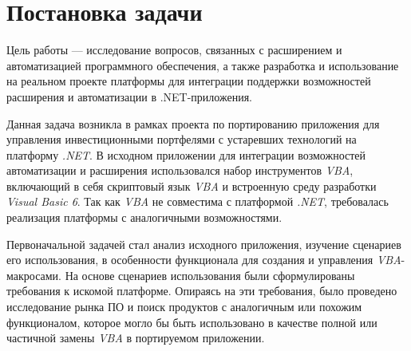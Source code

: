 \section{Постановка задачи}
\label{sec:problem_statement}

Цель работы --- исследование вопросов, связанных с расширением и автоматизацией программного обеспечения, а также разработка и использование на реальном проекте платформы для интеграции поддержки возможностей расширения и автоматизации в .NET-приложения.

Данная задача возникла в рамках проекта по портированию приложения для управления инвестиционными портфелями с устаревших технологий на платформу {\it .NET}. В исходном приложении для интеграции возможностей автоматизации и расширения использовался набор инструментов {\it VBA}, включающий в себя скриптовый язык {\it VBA} и встроенную среду разработки {\it Visual Basic 6}. Так как {\it VBA} не совместима с платформой {\it .NET}, требовалась реализация платформы с аналогичными возможностями. 

Первоначальной задачей стал анализ исходного приложения, изучение сценариев его использования, в особенности функционала для создания и управления {\it VBA}-макросами. На основе сценариев использования были сформулированы требования к искомой платформе. Опираясь на эти требования, было проведено исследование рынка ПО и поиск продуктов с аналогичным или похожим функционалом, которое могло бы быть использовано в качестве полной или частичной замены {\it VBA} в портируемом приложении.



\pagebreak